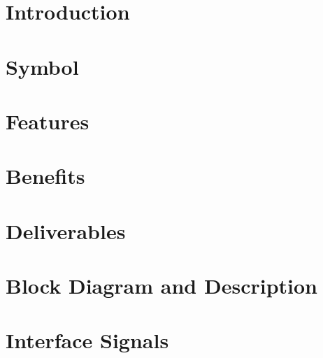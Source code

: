 \documentclass{../../submodules/TEX/document/ug/ug}
\begin{document}
\maketitle
\cleardoublepage
\tableofcontents
\listoftables
\listoffigures
\cleardoublepage

\section{Introduction}


\section{Symbol}


\section{Features}


\section{Benefits}


\section{Deliverables}


\section{Block Diagram and Description}


\ifnum{}

\fi

\section{Interface Signals}


\ifnum{}

\fi

\ifnum{}

\fi

\ifnum{}

\fi



\ifnum{}

\fi
\end{document}
